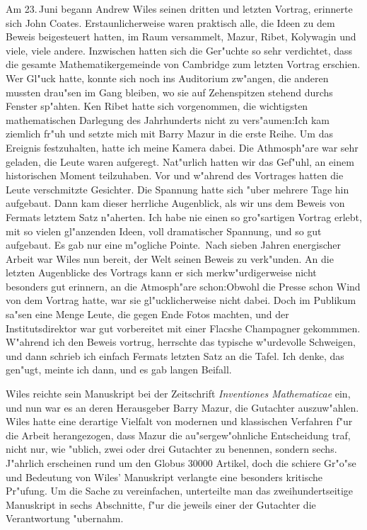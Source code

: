 \documentclass[11pt]{article}
\begin{document}
Am 23.\,Juni begann Andrew Wiles seinen dritten und letzten Vortrag, erinnerte 
sich John Coates. Erstaunlicherweise waren praktisch alle, die Ideen zu dem 
Beweis beigesteuert hatten, im Raum versammelt, Mazur, Ribet, Kolywagin und 
viele, viele andere. Inzwischen hatten sich die Ger"uchte so sehr verdichtet, 
dass die gesamte Mathematikergemeinde von Cambridge zum letzten Vortrag 
erschien. Wer Gl"uck hatte, konnte sich noch ins  Auditorium zw"angen, die 
anderen mussten drau"sen im Gang bleiben, wo sie auf Zehenspitzen stehend 
durchs Fenster sp"ahten. Ken Ribet hatte sich vorgenommen, die wichtigsten 
mathematischen Darlegung des Jahrhunderts nicht zu vers"aumen:\glqq Ich kam 
ziemlich fr"uh und setzte mich mit Barry Mazur in die erste Reihe. Um das 
Ereignis festzuhalten, hatte ich meine Kamera dabei.  Die Athmosph"are war sehr 
geladen, die Leute waren aufgeregt. Nat"urlich hatten wir das Gef"uhl, an einem 
historischen Moment teilzuhaben. Vor und w"ahrend des Vortrages hatten die 
Leute verschmitzte Gesichter. Die Spannung hatte sich "uber mehrere Tage hin 
aufgebaut. Dann kam dieser herrliche Augenblick, als wir uns dem Beweis von 
Fermats letztem Satz n"aherten. Ich habe nie einen so gro"sartigen Vortrag 
erlebt, mit so vielen gl"anzenden Ideen, voll dramatischer Spannung, und so gut 
aufgebaut. Es gab nur eine m"ogliche Pointe.\grqq\ Nach sieben Jahren 
energischer Arbeit war Wiles nun bereit, der Welt seinen Beweis zu verk"unden. 
An die letzten Augenblicke des Vortrags kann er sich merkw"urdigerweise nicht 
besonders gut erinnern, an die Atmosph"are schon:\glqq Obwohl die Presse schon 
Wind von dem Vortrag hatte, war sie gl"ucklicherweise nicht dabei. Doch im 
Publikum sa"sen eine Menge Leute, die gegen Ende Fotos machten, und der 
Institutsdirektor war gut vorbereitet mit einer Flacshe Champagner gekommmen. 
W"ahrend ich den Beweis vortrug, herrschte das typische w"urdevolle Schweigen, 
und dann schrieb ich einfach Fermats letzten Satz an die Tafel. \glq Ich denke, 
das gen"ugt\grq, meinte ich dann, und es gab langen Beifall\grqq.

Wiles reichte sein Manuskript bei der Zeitschrift {\em Inventiones 
Mathematicae} ein, und nun war es an deren Herausgeber Barry Mazur, die 
Gutachter auszuw"ahlen. Wiles hatte eine derartige Vielfalt von modernen und 
klassischen Verfahren f"ur die Arbeit herangezogen, dass Mazur die 
au"sergew"ohnliche Entscheidung traf, nicht nur, wie "ublich, zwei oder drei 
Gutachter zu benennen, sondern sechs. J"ahrlich erscheinen rund um den Globus 
30000 Artikel, doch die schiere Gr"o"se und Bedeutung von 
Wiles' Manuskript verlangte eine besonders kritische Pr"ufung. Um die Sache zu 
vereinfachen, unterteilte man das zweihundertseitige Manuskript in sechs 
Abschnitte, f"ur die jeweils einer der Gutachter die Verantwortung "ubernahm.
\end{document}
